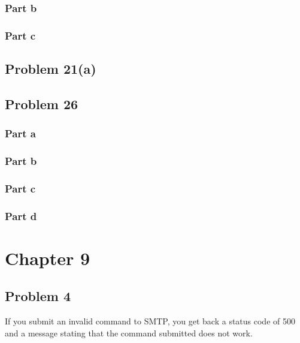 \documentclass{article}%
\begin{document}
\subsubsection*{Part b}
\subsubsection*{Part c}


\subsection*{Problem 21(a)}


\subsection*{Problem 26}

\subsubsection*{Part a}
\subsubsection*{Part b}
\subsubsection*{Part c}
\subsubsection*{Part d}


\section*{Chapter 9}
\subsection*{Problem 4}
If you submit an invalid command to SMTP, you get back a status code of 500 and a message
stating that the command submitted does not work.
\end{document}
